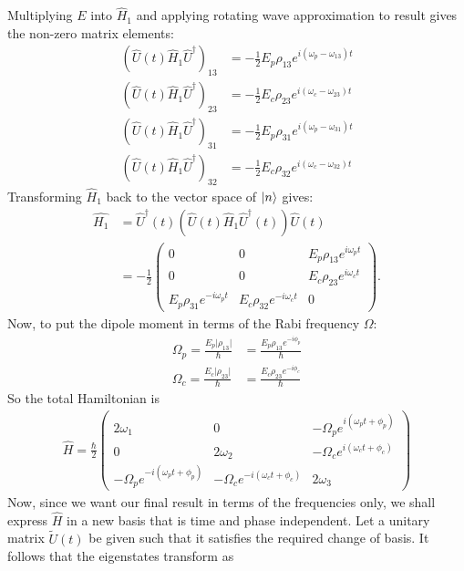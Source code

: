 \documentclass{article}
\theoremstyle{definition}
\begin{document}
Multiplying $E$ into $\hat{H}_1$ and applying rotating wave approximation to result gives the non-zero matrix elements:
\begin{align}
\left( \hat{U}(t)\hat{H}_1\hat{U}^\dagger\right)_{13} &= 
-\frac{1}{2}E_p \rho_{13}e^{i(\omega_p - \omega_{13})t}\\
\left( \hat{U}(t)\hat{H}_1\hat{U}^\dagger\right)_{23} &= 
-\frac{1}{2}E_c \rho_{23}e^{i(\omega_c - \omega_{23})t}\\
\left( \hat{U}(t)\hat{H}_1\hat{U}^\dagger\right)_{31} &= 
-\frac{1}{2}E_p \rho_{31}e^{i(\omega_p - \omega_{31})t}\\
\left( \hat{U}(t)\hat{H}_1\hat{U}^\dagger\right)_{32} &= 
-\frac{1}{2}E_c \rho_{32}e^{i(\omega_c - \omega_{32})t}
\end{align}
Transforming $\hat{H}_1$ back to the vector space of $\ket{n}$ gives:
\begin{align}
\hat{H_1} &= \hat{U}^\dagger(t) \left( \hat{U}(t) \hat{H}_1 \hat{U}^\dagger(t)\right) \hat{U}(t) \nonumber \\
&= 
-\frac{1}{2}\begin{pmatrix}
0 & 0 & E_p\rho_{13}e^{i\omega_pt}\\
0 & 0 & E_c\rho_{23}e^{i\omega_ct}\\
E_p\rho_{31}e^{-i\omega_pt} & E_c\rho_{32}e^{-i\omega_ct} & 0
\end{pmatrix}.
\end{align}
Now, to put the dipole moment in terms of the Rabi frequency $\Omega$:
\begin{align}
\Omega_p = \frac{E_p\vert \rho_{13} \vert}{\hbar} &= \frac{E_p\rho_{13}e^{-i\phi_p}}{\hbar}\\
\Omega_c = \frac{E_c\vert \rho_{23} \vert}{\hbar} &= \frac{E_c\rho_{23}e^{-i\phi_c}}{\hbar}
\end{align}
So the total Hamiltonian is
\begin{align}
\hat{H} = \frac{\hbar}{2}
\begin{pmatrix}
2\omega_1 & 0 & -\Omega_pe^{i(\omega_pt+\phi_p)}\\
0 & 2\omega_2 & -\Omega_ce^{i(\omega_ct+\phi_c)}\\
-\Omega_pe^{-i(\omega_pt+\phi_p)} & -\Omega_ce^{-i(\omega_ct+\phi_c)} & 2\omega_3
\end{pmatrix}
\end{align}
Now, since we want our final result in terms of the frequencies only, we shall express $\hat{H}$ in a new basis that is time and phase independent. Let a unitary matrix $\tilde{U}(t)$ be given such that it satisfies the required change of basis. It follows that the eigenstates transform as
\end{document}
